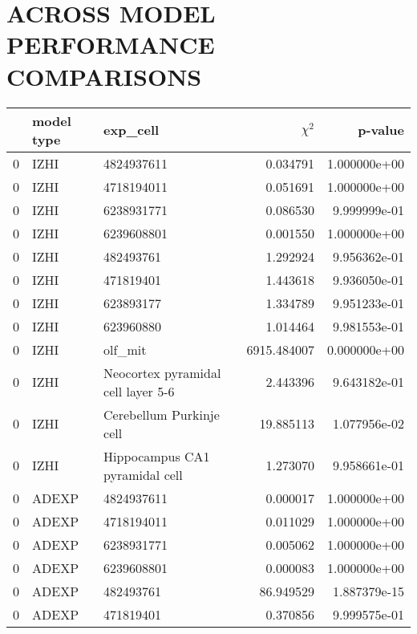 \chapter{ACROSS MODEL PERFORMANCE COMPARISONS}
\begin{tabular}{lllrr}
\toprule
{} & model type &                            exp\_cell &   $\chi^{2}$ &       p-value \\
\midrule
0 &        IZHI &                          4824937611 &     0.034791 &  1.000000e+00 \\
0 &        IZHI &                          4718194011 &     0.051691 &  1.000000e+00 \\
0 &        IZHI &                          6238931771 &     0.086530 &  9.999999e-01 \\
0 &        IZHI &                          6239608801 &     0.001550 &  1.000000e+00 \\
0 &        IZHI &                           482493761 &     1.292924 &  9.956362e-01 \\
0 &        IZHI &                           471819401 &     1.443618 &  9.936050e-01 \\
0 &        IZHI &                           623893177 &     1.334789 &  9.951233e-01 \\
0 &        IZHI &                           623960880 &     1.014464 &  9.981553e-01 \\
0 &        IZHI &                             olf\_mit &  6915.484007 &  0.000000e+00 \\
0 &        IZHI &  Neocortex pyramidal cell layer 5-6 &     2.443396 &  9.643182e-01 \\
0 &        IZHI &            Cerebellum Purkinje cell &    19.885113 &  1.077956e-02 \\
0 &        IZHI &      Hippocampus CA1 pyramidal cell &     1.273070 &  9.958661e-01 \\
0 &       ADEXP &                          4824937611 &     0.000017 &  1.000000e+00 \\
0 &       ADEXP &                          4718194011 &     0.011029 &  1.000000e+00 \\
0 &       ADEXP &                          6238931771 &     0.005062 &  1.000000e+00 \\
0 &       ADEXP &                          6239608801 &     0.000083 &  1.000000e+00 \\
0 &       ADEXP &                           482493761 &    86.949529 &  1.887379e-15 \\
0 &       ADEXP &                           471819401 &     0.370856 &  9.999575e-01 \\

\end{tabular}
